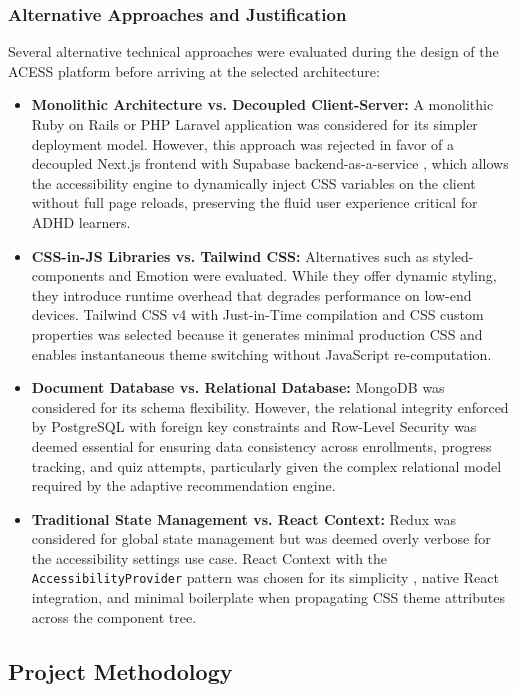 \documentclass[12pt, oneside]{article} %
\begin{document}
\subsubsection{Alternative Approaches and Justification}

Several alternative technical approaches were evaluated during the design of the ACESS platform before arriving at the selected architecture:

\begin{itemize}
    \item \textbf{Monolithic Architecture vs. Decoupled Client-Server:} A monolithic Ruby on Rails or PHP Laravel application was considered for its simpler deployment model. However, this approach was rejected in favor of a decoupled Next.js frontend \cite{nextjs_ssr} with Supabase backend-as-a-service \cite{supabase_docs}, which allows the accessibility engine to dynamically inject CSS variables on the client without full page reloads, preserving the fluid user experience critical for ADHD learners.
    \item \textbf{CSS-in-JS Libraries vs. Tailwind CSS:} Alternatives such as styled-components and Emotion were evaluated. While they offer dynamic styling, they introduce runtime overhead that degrades performance on low-end devices. Tailwind CSS v4 \cite{tailwind_docs} with Just-in-Time compilation and CSS custom properties was selected because it generates minimal production CSS and enables instantaneous theme switching without JavaScript re-computation.
    \item \textbf{Document Database vs. Relational Database:} MongoDB was considered for its schema flexibility. However, the relational integrity enforced by PostgreSQL with foreign key constraints and Row-Level Security \cite{supabase_rls} was deemed essential for ensuring data consistency across enrollments, progress tracking, and quiz attempts, particularly given the complex relational model required by the adaptive recommendation engine.
    \item \textbf{Traditional State Management vs. React Context:} Redux was considered for global state management but was deemed overly verbose for the accessibility settings use case. React Context with the \texttt{AccessibilityProvider} pattern was chosen for its simplicity \cite{react_docs}, native React integration, and minimal boilerplate when propagating CSS theme attributes across the component tree.
\end{itemize}

\subsection{Project Methodology}
\end{document}
